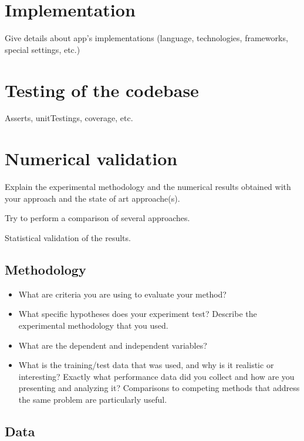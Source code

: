 \documentclass[twoside,runningheads,a4paper,11pt]{report}
\begin{document}
\section{Implementation}
\label{section:appImplementation}

Give details about app's implementations (language, technologies, frameworks, special settings, etc.)


\section{Testing of the codebase}
\label{section:appTesting}

Asserts, unitTestings, coverage, etc.


\section{Numerical validation}
\label{section:numericalValidation}

Explain the experimental methodology and the numerical results obtained with your approach and the state of art approache(s).

Try to perform a comparison of several approaches.

Statistical validation of the results.


\subsection{Methodology}
\label{section:methodology}

\begin{itemize}
	\item What are criteria you are using to evaluate your method? 
	\item What specific hypotheses does your experiment test? Describe the experimental methodology that you used. 
	\item What are the dependent and independent variables? 
	\item What is the training/test data that was used, and why is it realistic or interesting? Exactly what performance data did you collect and how are you presenting and analyzing it? Comparisons to competing methods that address the same problem are particularly useful.
\end{itemize}

\subsection{Data}
\label{section:data}
\end{document}
